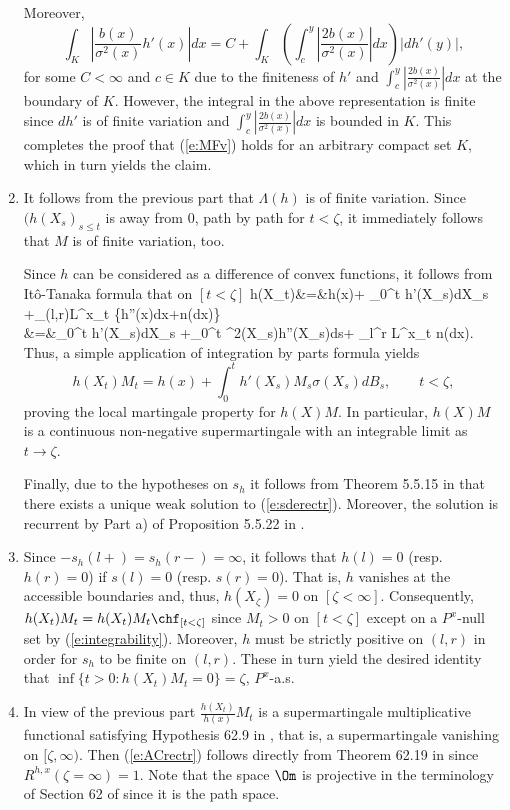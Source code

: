 \documentclass[11pt,reqno]{amsart}
\numberwithin{equation}{section}
\def\rar{\rightarrow}
\begin{document}
\begin{enumerate}[leftmargin=*]
		Moreover,
		\[
		\int_K \left|\frac{b(x)}{\sigma^2(x)}h'(x)\right|dx=C + \int_K \left(\int_c^y \left|\frac{2b(x)}{\sigma^2(x)}\right|dx\right)|dh'(y)|,
		\]
		for some $C<\infty$ and $c \in K$ due to the finiteness of $h'$ and $\int_c^y \left|\frac{2b(x)}{\sigma^2(x)}\right|dx$ at the boundary of $K$. However, the integral in the above representation is finite since $dh'$ is of finite variation and  $\int_c^y \left|\frac{2b(x)}{\sigma^2(x)}\right|dx$ is bounded in $K$. This completes the proof that (\ref{e:MFv}) holds for an arbitrary compact set $K$, which in turn yields the claim.
		\item It follows from the previous part that $\Lambda(h)$ is of finite variation. Since $(h(X_s)_{s \leq t}$ is away from $0$, path by path for $t<\zeta$, it immediately follows that $M$ is of finite variation, too.  
		
		Since $h$ can be considered as a difference of convex functions, it follows from It\^{o}-Tanaka formula that on $[t<\zeta]$
		\bean
		h(X_t)&=&h(x)+ \int_0^t h'(X_s)dX_s +\half\int_{(l,r)}L^x_t \left\{h''(x)dx+n(dx)\right\}\\
		&=&\int_0^t h'(X_s)dX_s +\half\int_0^t \sigma^2(X_s)h''(X_s)ds+ \half\int_l^r L^x_t n(dx).
		\eean
		Thus, a simple application of integration by parts formula yields
		\[
		h(X_t)M_t=h(x)+ \int_0^t h'(X_s)M_s\sigma(X_s)dB_s, \qquad t <\zeta,
		\]
		proving the local martingale property for $h(X)M$. In particular, $h(X)M$ is a continuous non-negative supermartingale with an integrable limit as $t \rar \zeta$. 
		
		Finally, due to the hypotheses on $s_h$ it follows from Theorem 5.5.15 in \cite{KS} that there exists a unique weak solution to (\ref{e:sderectr}). Moreover, the solution is recurrent by Part a) of Proposition 5.5.22 in \cite{KS}.
		\item Since $-s_h(l+)=s_h(r-)=\infty$, it follows that $h(l)=0$ (resp. $h(r)=0$) if $s(l)=0$ (resp. $s(r)=0$). That is, $h$ vanishes at the accessible boundaries and, thus, $h(X_{\zeta})=0$ on $[\zeta<\infty]$. Consequently,  $h(X_t)M_t=h(X_t)M_t\chf_{[t<\zeta]}$ since $M_t>0$ on $[t <\zeta]$ except on a $P^x$-null set by (\ref{e:integrability}). Moreover, $h$ must be strictly positive on $(l,r)$ in order for $s_h$ to be finite on $(l,r)$. These in turn yield the desired identity that $\inf\{t>0:h(X_t)M_t=0\}=\zeta, \,P^x$-a.s. \item In view of the previous part $\frac{h(X_t)}{h(x)}M_t$  is a supermartingale multiplicative functional satisfying Hypothesis 62.9 in \cite{GTMP}, that is, a supermartingale vanishing on $[\zeta,\infty)$. Then (\ref{e:ACrectr}) follows directly from Theorem 62.19 in \cite{GTMP} since $R^{h,x}(\zeta=\infty)=1$. Note that the space $\Om$ is projective in the terminology of Section 62 of \cite{GTMP} since it is the path space.  
		

\end{enumerate}
\end{document}
